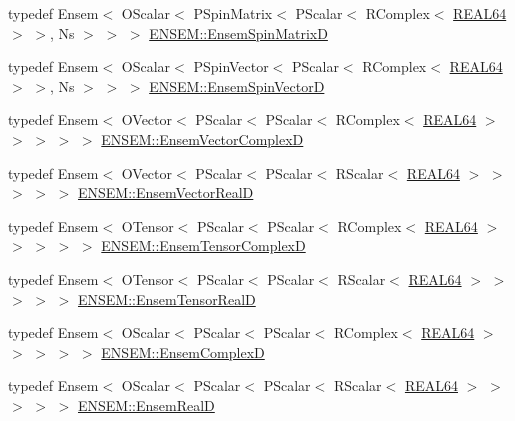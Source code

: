 \begin{DoxyCompactItemize}
\item 
typedef Ensem$<$ O\+Scalar$<$ P\+Spin\+Matrix$<$ P\+Scalar$<$ R\+Complex$<$ \mbox{\hyperlink{adat-devel_2lib_2ensem_2ensem__precision_8h_aa31d9c0fbe9c64fbd64dd463f6e63178}{R\+E\+A\+L64}} $>$ $>$, Ns $>$ $>$ $>$ \mbox{\hyperlink{group__defs_ga06a2bf065fb18ba1aa1217fc56b85e94}{E\+N\+S\+E\+M\+::\+Ensem\+Spin\+MatrixD}}
\item 
typedef Ensem$<$ O\+Scalar$<$ P\+Spin\+Vector$<$ P\+Scalar$<$ R\+Complex$<$ \mbox{\hyperlink{adat-devel_2lib_2ensem_2ensem__precision_8h_aa31d9c0fbe9c64fbd64dd463f6e63178}{R\+E\+A\+L64}} $>$ $>$, Ns $>$ $>$ $>$ \mbox{\hyperlink{group__defs_gae8a1e894c16ec6be00388813ab08115c}{E\+N\+S\+E\+M\+::\+Ensem\+Spin\+VectorD}}
\item 
typedef Ensem$<$ O\+Vector$<$ P\+Scalar$<$ P\+Scalar$<$ R\+Complex$<$ \mbox{\hyperlink{adat-devel_2lib_2ensem_2ensem__precision_8h_aa31d9c0fbe9c64fbd64dd463f6e63178}{R\+E\+A\+L64}} $>$ $>$ $>$ $>$ $>$ \mbox{\hyperlink{group__defs_gaaee70d31501194625b4827518c28934c}{E\+N\+S\+E\+M\+::\+Ensem\+Vector\+ComplexD}}
\item 
typedef Ensem$<$ O\+Vector$<$ P\+Scalar$<$ P\+Scalar$<$ R\+Scalar$<$ \mbox{\hyperlink{adat-devel_2lib_2ensem_2ensem__precision_8h_aa31d9c0fbe9c64fbd64dd463f6e63178}{R\+E\+A\+L64}} $>$ $>$ $>$ $>$ $>$ \mbox{\hyperlink{group__defs_ga7e294215cc7d7c343921ba1aef53d4dd}{E\+N\+S\+E\+M\+::\+Ensem\+Vector\+RealD}}
\item 
typedef Ensem$<$ O\+Tensor$<$ P\+Scalar$<$ P\+Scalar$<$ R\+Complex$<$ \mbox{\hyperlink{adat-devel_2lib_2ensem_2ensem__precision_8h_aa31d9c0fbe9c64fbd64dd463f6e63178}{R\+E\+A\+L64}} $>$ $>$ $>$ $>$ $>$ \mbox{\hyperlink{group__defs_ga15d48d3a11743bbf79e7b90cf889f3f0}{E\+N\+S\+E\+M\+::\+Ensem\+Tensor\+ComplexD}}
\item 
typedef Ensem$<$ O\+Tensor$<$ P\+Scalar$<$ P\+Scalar$<$ R\+Scalar$<$ \mbox{\hyperlink{adat-devel_2lib_2ensem_2ensem__precision_8h_aa31d9c0fbe9c64fbd64dd463f6e63178}{R\+E\+A\+L64}} $>$ $>$ $>$ $>$ $>$ \mbox{\hyperlink{group__defs_gaa7c1a5f20d03b806876d3ab2576ec104}{E\+N\+S\+E\+M\+::\+Ensem\+Tensor\+RealD}}
\item 
typedef Ensem$<$ O\+Scalar$<$ P\+Scalar$<$ P\+Scalar$<$ R\+Complex$<$ \mbox{\hyperlink{adat-devel_2lib_2ensem_2ensem__precision_8h_aa31d9c0fbe9c64fbd64dd463f6e63178}{R\+E\+A\+L64}} $>$ $>$ $>$ $>$ $>$ \mbox{\hyperlink{group__defs_gaa1c62d46cc410553bbcb87757e212505}{E\+N\+S\+E\+M\+::\+Ensem\+ComplexD}}
\item 
typedef Ensem$<$ O\+Scalar$<$ P\+Scalar$<$ P\+Scalar$<$ R\+Scalar$<$ \mbox{\hyperlink{adat-devel_2lib_2ensem_2ensem__precision_8h_aa31d9c0fbe9c64fbd64dd463f6e63178}{R\+E\+A\+L64}} $>$ $>$ $>$ $>$ $>$ \mbox{\hyperlink{group__defs_gaabc6e707d8e7066c144fa8f9fa002f2e}{E\+N\+S\+E\+M\+::\+Ensem\+RealD}}

\end{DoxyCompactItemize}
